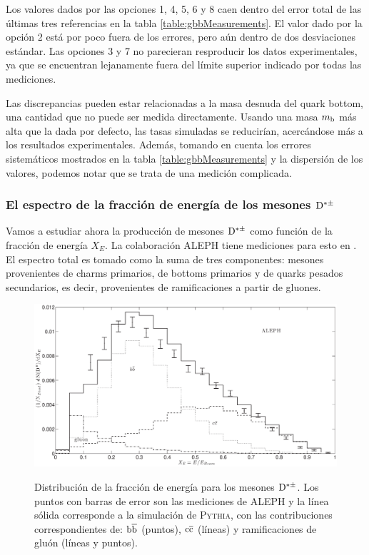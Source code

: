 \documentclass[a4paper,12pt]{article}
\begin{document}
Los valores dados por las opciones 1, 4, 5, 6 y 8 caen dentro del error total de las últimas tres referencias en la tabla \ref{table:gbbMeasurements}. El valor dado por la opción 2 está por poco fuera de los errores, pero aún dentro de dos desviaciones estándar. Las opciones 3 y 7 no parecieran resproducir los datos experimentales, ya que se encuentran lejanamente fuera del límite superior indicado por todas las mediciones.

Las discrepancias pueden estar relacionadas a la masa desnuda del quark bottom, una cantidad que no puede ser medida directamente. Usando una masa $m_{\mathrm b}$ más alta que la dada por defecto, las tasas simuladas se reducirían, acercándose más a los resultados experimentales. Además, tomando en cuenta los errores sistemáticos mostrados en la tabla \ref{table:gbbMeasurements} y la dispersión de los valores, podemos notar que se trata de una medición complicada.

\subsubsection{El espectro de la fracción de energía de los mesones $\D^{*\pm}$}

Vamos a estudiar ahora la producción de mesones $\D^{*\pm}$ como función de la fracción de energía $X_E$. La colaboración ALEPH tiene mediciones para esto en \cite{Barate:1999bg}. El espectro total es tomado como la suma de tres componentes: mesones provenientes de charms primarios, de bottoms primarios y de quarks pesados secundarios, es decir, provenientes de ramificaciones a partir de gluones.

\begin{figure}[h]
\centering
\caption[Espectro de la fracción de energía de los mesones $\D^{*\pm}$.]{Distribución de la fracción de energía para los mesones  $\D^{*\pm}$. Los puntos con barras de error son las mediciones de ALEPH  y la línea sólida corresponde a la simulación de \textsc{Pythia}, con las contribuciones correspondientes de: ${\mathrm b}\overline{\mathrm b}$ (puntos), ${\mathrm c}\overline{\mathrm c}$ (líneas) y ramificaciones de gluón (líneas y puntos).}
\includegraphics[width=15cm]{DStarOp1Thesis}
\label{fig:ALEPHPythia1}
\end{figure}
\end{document}
